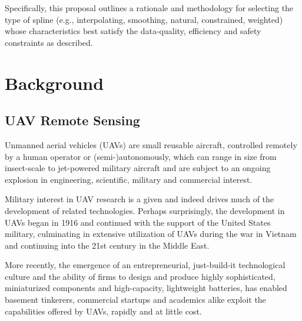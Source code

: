 \documentclass[doc]{apa6}
\begin{document}
Specifically, this proposal outlines a rationale and methodology for selecting the type of spline (e.g., interpolating, smoothing, natural, constrained, weighted) whose characteristics best satisfy the data-quality, efficiency and safety constraints as described. 

\section{Background}

\subsection{UAV Remote Sensing}

Unmanned aerial vehicles (UAVs) are small reusable aircraft, controlled remotely by a human operator or (semi-)autonomously, which can range in size from insect-scale to jet-powered military aircraft \parencite{Avadhanula2002,Deng2003} and are subject to an ongoing explosion in engineering, scientific, military and commercial interest. 

Military interest in UAV research is a given and indeed drives much of the development of related technologies. Perhaps surprisingly, the development in UAVs began in 1916 and continued with the support of the United States military, culminating in extensive utilization of UAVs during the war in Vietnam \parencite{Valavanis2007,Cook2007} and continuing into the 21st century in the Middle East. 

More recently, the emergence of an entrepreneurial, just-build-it technological culture and the ability of firms to design and produce highly sophisticated, miniaturized components and high-capacity, lightweight batteries, has enabled basement tinkerers, commercial startups and academics alike exploit the capabilities offered by UAVs, rapidly and at little cost.

\end{document}
